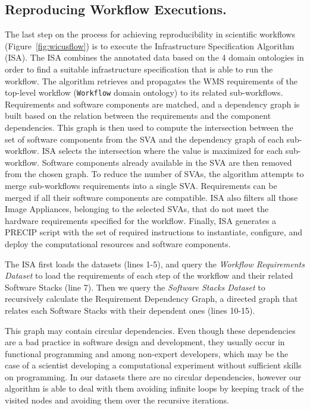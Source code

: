 \subsection{Reproducing Workflow Executions.}

The last step on the process for achieving reproducibility in scientific workflows (Figure~\ref{fig:wicusflow}) is to execute the Infrastructure Specification Algorithm (ISA). The ISA combines the annotated data based on the 4 domain ontologies in order to find a suitable infrastructure specification that is able to run the workflow. The algorithm retrieves and propagates the WMS requirements of the top-level workflow (\texttt{Workflow} domain ontology) to its related sub-workflows. Requirements and software components are matched, and a dependency graph is built based on the relation between the requirements and the component dependencies. This graph is then used to compute the intersection between the set of software components from the SVA and the dependency graph of each sub-workflow. ISA selects the intersection where the value is maximized for each sub-workflow. Software components already available in the SVA are then removed from the chosen graph. To reduce the number of SVAs, the algorithm attempts to merge sub-workflows requirements into a single SVA. Requirements can be merged if all their software components are compatible. ISA also filters all those Image Appliances, belonging to the selected SVAs, that do not meet the hardware requirements specified for the workflow. Finally, ISA generates a PRECIP script with the set of required instructions to instantiate, configure, and deploy the computational resources and software components.


The ISA first loads the datasets (lines 1-5), and query the {\it Workflow Requirements Dataset} to load the requirements of each step of the workflow and their related Software Stacks (line 7). Then we query the {\it Software Stacks Dataset} to recursively calculate the Requirement Dependency Graph, a directed graph that relates each Software Stacks with their dependent ones (lines 10-15).

This graph may contain circular dependencies. Even though these dependencies are a bad practice in software design and development, they usually occur in functional programming and among non-expert developers, which may be the case of a scientist developing a computational experiment without sufficient skills on programming. In our datasets there are no circular dependencies, however our algorithm is able to deal with them avoiding infinite loops by keeping track of the visited nodes and avoiding them over the recursive iterations.

